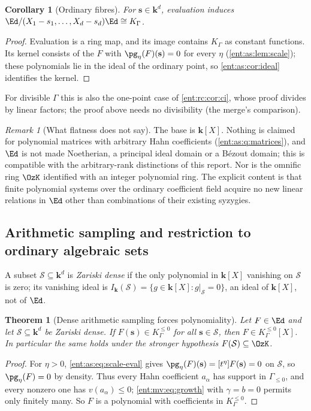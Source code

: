 \documentclass[11pt]{article}
\newtheorem{theorem}{Theorem}[section]
\theoremstyle{plain}
\theoremstyle{plain}
\theoremstyle{plain}
\newtheorem{corollary}[corollary]{Corollary}
\theoremstyle{definition}
\theoremstyle{definition}
\theoremstyle{definition}
\theoremstyle{definition}
\theoremstyle{remark}
\newtheorem{remark}[remark]{Remark}
\newcommand{\K}{K_\Gamma}\newcommand{\KD}{K_\Delta}
\newcommand{\kk}{\mathbf k}\newcommand{\PP}{\mathbb P}
\newcommand{\Kle}{K_\Gamma^{\le0}}\DeclareMathOperator{\Jac}{Jac}
\begin{document}
\begin{corollary}[Ordinary fibres]\label{ent:as:cor:fiber}
For $\mathbf s\in\kk^d$, evaluation induces
$\Ed/(X_1-s_1,\ldots,X_d-s_d)\Ed\cong\K$.
\end{corollary}
\begin{proof}
Evaluation is a ring map, and its image contains $\K$ as constant functions.
Its kernel consists of the $F$ with $\pg_\eta(F)(\mathbf s)=0$ for every $\eta$
(\cref{ent:as:lem:scale}); these polynomials lie in the ideal of the ordinary
point, so \cref{ent:as:cor:ideal} identifies the kernel.
\end{proof}

For divisible $\Gamma$ this is also the one-point case of
\cref{ent:rc:cor:ci}, whose proof divides by linear factors; the proof above
needs no divisibility (the merge's comparison).

\begin{remark}[What flatness does not say]\label{ent:as:rem:flatness}
The base is $\kk[X]$. Nothing is claimed for polynomial matrices with
arbitrary Hahn coefficients (\cref{ent:as:q:matrices}), and $\Ed$ is not made
Noetherian, a principal ideal domain or a B\'ezout domain; this is compatible
with the arbitrary-rank distinctions of this report. Nor is the omnific ring
$\OzK$ identified with an integer polynomial ring. The explicit content is that
finite polynomial systems over the ordinary coefficient field acquire no new
linear relations in $\Ed$ other than combinations of their existing syzygies.
\end{remark}

\subsection{Arithmetic sampling and restriction to ordinary algebraic sets}
\label{ent:as:subsec:sampling}

A subset $\mathcal S\subseteq\kk^d$ is \emph{Zariski dense} if the only
polynomial in $\kk[X]$ vanishing on $\mathcal S$ is zero; its vanishing ideal is
$I_\kk(\mathcal S)=\{g\in\kk[X]:g|_{\mathcal S}=0\}$, an ideal of $\kk[X]$, not
of $\Ed$.

\begin{theorem}[Dense arithmetic sampling forces polynomiality]
\label{ent:as:thm:sampling}
Let $F\in\Ed$ and let $\mathcal S\subseteq\kk^d$ be Zariski dense. If
$F(\mathbf s)\in\Kle$ for all $\mathbf s\in\mathcal S$, then $F\in\Kle[X]$. In
particular the same holds under the stronger hypothesis
$F(\mathcal S)\subseteq\OzK$.
\end{theorem}
\begin{proof}
For $\eta>0$, \eqref{ent:as:eq:scale-eval} gives
$\pg_\eta(F)(\mathbf s)=[t^\eta]F(\mathbf s)=0$ on $\mathcal S$, so
$\pg_\eta(F)=0$ by density. Thus every Hahn coefficient $a_\alpha$ has support
in $\Gamma_{\le0}$, and every nonzero one has $v(a_\alpha)\le0$;
\eqref{ent:mv:eq:growth} with $\gamma=b=0$ permits only finitely many. So $F$ is
a polynomial with coefficients in $\Kle$.
\end{proof}
\end{document}
